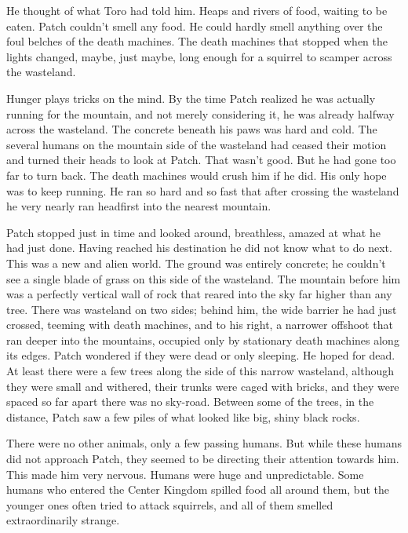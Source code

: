 \documentclass[ebook,oneside,openany,17pt]{memoir}
\newenvironment{tolerant}[1]{%
  \par\tolerance=#1\relax
}{%
  \par
}
\begin{document}
\begin{tolerant}{1000}
He thought of what Toro had told him. Heaps and rivers of food,
waiting to be eaten. Patch couldn’t smell any food. He could hardly
smell anything over the foul belches of the death machines. The death
machines that stopped when the lights changed, maybe, just maybe, long
enough for a squirrel to scamper across the wasteland.
\end{tolerant}

\begin{tolerant}{500}
Hunger plays tricks on the mind. By the time Patch realized he was
actually running for the mountain, and not merely considering it, he
was already halfway across the wasteland. The concrete beneath his
paws was hard and cold. The several humans on the mountain side of the
wasteland had ceased their motion and turned their heads to look at
Patch. That wasn’t good. But he had gone too far to turn back. The
death machines would crush him if he did. His only hope was to keep
running. He ran so hard and so fast that after crossing the wasteland
he very nearly ran headfirst into the nearest mountain.
\end{tolerant}

Patch stopped just in time and looked around, breathless, amazed at
what he had just done. Having reached his destination he did not know
what to do next. This was a new and alien world. The ground was
entirely concrete; he couldn’t see a single blade of grass on this
side of the wasteland. The mountain before him was a perfectly
vertical wall of rock that reared into the sky far higher than any
tree. There was wasteland on two sides; behind him, the wide barrier
he had just crossed, teeming with death machines, and to his right, a
narrower offshoot that ran deeper into the mountains, occupied only by
stationary death machines along its edges. Patch wondered if they were
dead or only sleeping. He hoped for dead. At least there were a few
trees along the side of this narrow wasteland, although they were
small and withered, their trunks were caged with bricks, and they were
spaced so far apart there was no sky-road. Between some of the trees,
in the distance, Patch saw a few piles of what looked like big, shiny
black rocks.

There were no other animals, only a few passing humans. But while
these humans did not approach Patch, they seemed to be directing their
attention towards him. This made him very nervous. Humans were huge
and unpredictable. Some humans who entered the Center Kingdom spilled
food all around them, but the younger ones often tried to attack
squirrels, and all of them smelled extraordinarily strange.
\end{document}

